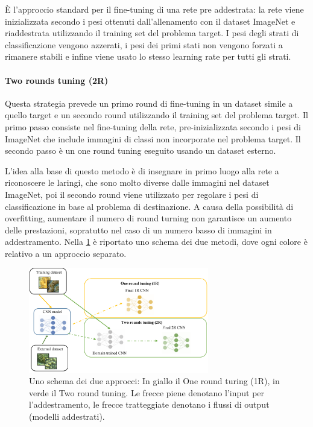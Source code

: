 È l'approccio standard per il fine-tuning di una rete pre addestrata: la rete viene inizializzata secondo i pesi ottenuti dall'allenamento con il dataset ImageNet e riaddestrata utilizzando il training set del problema target. I pesi degli strati di classificazione vengono azzerati, i pesi dei primi stati non vengono forzati a rimanere stabili e infine viene usato lo stesso learning rate per tutti gli strati\cite{lumini_plankton}. 

\paragraph{Two rounds tuning (2R)} \label{two-round-tuning}

Questa strategia prevede un primo round di fine-tuning in un dataset simile a quello target e un secondo round utilizzando il training set del problema target. Il primo passo consiste nel fine-tuning della rete, pre-inizializzata secondo i pesi di ImageNet che include immagini di classi non incorporate nel problema target. Il secondo passo è un one round tuning eseguito usando un  dataset esterno. 

L'idea alla base di questo metodo è di insegnare in primo luogo alla rete a riconoscere le laringi, che sono molto diverse dalle immagini nel dataset ImageNet, poi il secondo round viene utilizzato per regolare i pesi di classificazione in base al problema di destinazione. A causa della possibilità di \gls{overfitting}, aumentare il numero di round turning non garantisce un aumento delle prestazioni, sopratutto nel caso di un numero basso di immagini in addestramento\cite{lumini_plankton}. Nella \cref{fig:tl_2rt}  è riportato uno schema dei due metodi, dove ogni colore è relativo a un approccio separato. 

\begin{figure}[ht]
    \centering
    \includegraphics[width=0.7\textwidth]{transfer-learning/tl_2rt.pdf}
    \caption{Uno schema dei due approcci: In giallo il One round turing (1R), in verde il Two round tuning. Le frecce piene denotano l'input per l'addestramento, le frecce tratteggiate denotano i flussi di output (modelli addestrati).}
    \label{fig:tl_2rt}
\end{figure}

